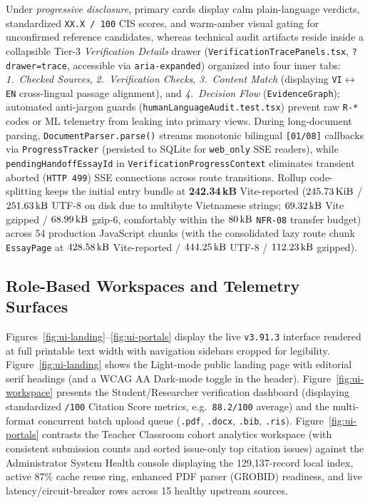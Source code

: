 Under \emph{progressive disclosure}, primary cards display calm plain-language verdicts, standardized \texttt{XX.X / 100} CIS scores, and warm-amber visual gating for unconfirmed reference candidates, whereas technical audit artifacts reside inside a collapsible Tier-3 \textit{Verification Details} drawer (\texttt{VerificationTracePanels.tsx}, \texttt{?drawer=trace}, accessible via \texttt{aria-expanded}) organized into four inner tabs: \textit{1.~Checked Sources}, \textit{2.~Verification Checks}, \textit{3.~Content Match} (displaying \texttt{VI}$\leftrightarrow$\texttt{EN} cross-lingual passage alignment), and \textit{4.~Decision Flow} (\texttt{EvidenceGraph}); automated anti-jargon guards (\texttt{humanLanguageAudit.test.tsx}) prevent raw \texttt{R-*} codes or ML telemetry from leaking into primary views. During long-document parsing, \texttt{DocumentParser.parse()} streams monotonic bilingual \texttt{[01/08]} callbacks via \texttt{ProgressTracker} (persisted to SQLite for \texttt{web\_only} SSE readers), while \texttt{pendingHandoffEssayId} in \texttt{VerificationProgressContext} eliminates transient aborted (\texttt{HTTP 499}) SSE connections across route transitions. Rollup code-splitting keeps the initial entry bundle at \textbf{242.34\,kB} Vite-reported ($245.73\text{\,KiB}$ / $251.63\text{\,kB}$ UTF-8 on disk due to multibyte Vietnamese strings; $69.32\text{\,kB}$ Vite gzipped / $68.99\text{\,kB}$ gzip-6, comfortably within the $80\text{\,kB}$ \texttt{NFR-08} transfer budget) across 54 production JavaScript chunks (with the consolidated lazy route chunk \texttt{EssayPage} at $428.58\text{\,kB}$ Vite-reported / $444.25\text{\,kB}$ UTF-8 / $112.23\text{\,kB}$ gzipped).

\subsection{Role-Based Workspaces and Telemetry Surfaces}

Figures~\ref{fig:ui-landing}--\ref{fig:ui-portals} display the live \texttt{v3.91.3} interface rendered at full printable text width with navigation sidebars cropped for legibility. Figure~\ref{fig:ui-landing} shows the Light-mode public landing page with editorial serif headings (and a WCAG AA Dark-mode toggle in the header). Figure~\ref{fig:ui-workspace} presents the Student/Researcher verification dashboard (displaying standardized \texttt{/100} Citation Score metrics, e.g.\ \texttt{88.2/100} average) and the multi-format concurrent batch upload queue (\texttt{.pdf}, \texttt{.docx}, \texttt{.bib}, \texttt{.ris}). Figure~\ref{fig:ui-portals} contrasts the Teacher Classroom cohort analytics workspace (with consistent submission counts and sorted issue-only top citation issues) against the Administrator System Health console displaying the 129,137-record local index, active $87\%$ cache reuse ring, enhanced PDF parser (GROBID) readiness, and live latency/circuit-breaker rows across 15 healthy upstream sources.

